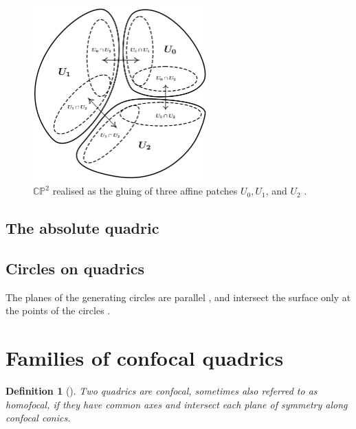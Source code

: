 \documentclass[12pt,a4paper]{article}
\theoremstyle{BoldTopSpacing}
\theoremstyle{BoldTopSpacing}
\theoremstyle{BoldTopSpacing}
\theoremstyle{BoldTopBottomSpacing}
\newtheorem{definition}{Definition}[section]
\theoremstyle{BoldTopSpacing}
\theoremstyle{BoldTopBottomSpacing}
\theoremstyle{remark}
\begin{document}
\begin{figure}[H]
    \centering
    \includegraphics[width=0.6\textwidth]{affine-patches.png}
    \caption{$\mathbb{C}\mathbb{P}^2$ realised as the gluing of three affine patches $U_0, U_1$, and $U_2$ \cite{toricfanovarieties2005}.}
    \label{fig:affine-patches-diagram}
\end{figure}

\subsection{The absolute quadric}
\label{subsec:absolute-quadrics}

\subsection{Circles on quadrics}
\label{subsec:circles-on-quadrics}

The planes of the generating circles are parallel \cite[\textcolor{CitationColor}{\textit{Lemma~2.1}}]{nilovSurfaceContainingLine2011}, and intersect the surface only at the points of the circles \cite[\textcolor{CitationColor}{\textit{Lemma~2.6}}]{nilovSurfaceContainingLine2011}.

\pagebreak
\section{Families of confocal quadrics}
\label{sec:confocal-quadrics}

\begin{definition}[]
\label{def:confocal-quadrics}
Two quadrics are \textit{confocal}, sometimes also referred to as \textit{homofocal}, if they have common axes and intersect each plane of symmetry along confocal conics.
\end{definition}
\end{document}
